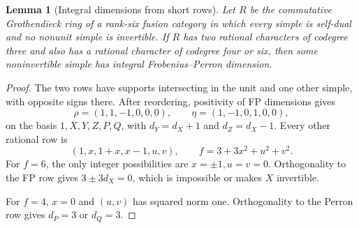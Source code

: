 \documentclass[11pt,reqno]{amsart}
\newtheorem{lemma}[theorem]{Lemma}
\theoremstyle{remark}\newtheorem{remark}[theorem]{Remark}
\numberwithin{equation}{section}
\begin{document}
\begin{lemma}[Integral dimensions from short rows]
\label{lem:r6-three-three-small}
Let $R$ be the commutative Grothendieck ring of a rank-six fusion
category in which every simple is self-dual and no nonunit simple
is invertible.  If $R$ has two rational characters of codegree
three and also has a rational character of codegree four or six,
then some noninvertible simple has integral Frobenius--Perron dimension.
\end{lemma}
\begin{proof}
The two rows have supports intersecting in the unit and one other
simple, with opposite signs there.
After reordering, positivity of FP dimensions gives
\[
 \rho=(1,1,-1,0,0,0),\qquad
 \eta=(1,-1,0,1,0,0),
\]
on the basis $1,X,Y,Z,P,Q$, with
$d_Y=d_X+1$ and $d_Z=d_X-1$.
Every other rational row is
\[
 (1,x,1+x,x-1,u,v),\qquad
 f=3+3x^2+u^2+v^2.
\]
For $f=6$, the only integer possibilities are
$x=\pm1,u=v=0$.
Orthogonality to the FP row gives $3\pm3d_X=0$,
which is impossible or makes $X$ invertible.

For $f=4$, $x=0$ and $(u,v)$ has squared norm one.
Orthogonality to the Perron row gives $d_P=3$ or $d_Q=3$.
\end{proof}
\end{document}
